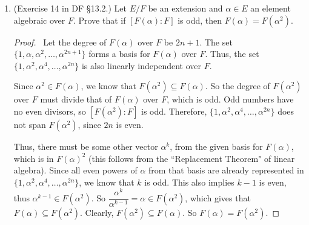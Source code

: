 \documentclass[10pt]{article}
\newcommand{\Q}{\mathbb{Q}}
\begin{document}
\begin{enumerate}[leftmargin=0cm,itemindent=.5cm,labelwidth=\itemindent,labelsep=0cm,align=left]
\begin{proof}

\ Let $F_0 = \Q$ and, for each $i = 1,2,\dots,n$, let $F_{i} = F_{i-1}(\alpha_i)$.  By previous theorems, $F_0 \subseteq F_1 \subseteq \cdots \subseteq F_n$ and $F_i = \Q(\alpha_1, \dots , \alpha_i)$ for all $i$.

If $\alpha_i \in F_{i-1}$, then $\alpha_i$ is the root of a linear polynomial over $F_{i-1}$, thus its minimal polynomial and hence, the degree of $F_i = F(\alpha_i)$ over $F_i$, is 1.  Otherwise, it is a root of the degree 2 polynomial $x^2 - \alpha_i^2 \in \Q[x] \subseteq F_{i-1}$ (since $\alpha_i^2 \in \Q$).  Since it is not the root of a linear polynomial, $x^2 - \alpha_i^2$ is its minimal polynomial, thus $F_i = F(\alpha_i)$ has degree 2 over $F_{i-1}$.  Therefore, $[F:\Q] = [F_n : F_{n-1}][F_{n-1}:F_{n-2}] \cdots [F_1 : F_0] = 2^k$ for some integer $k$.

We know that $\sqrt[3]{2}$ has degree $3$ over $\Q$, since $x^3 - 2$ is irreducible over $\Q$ by Eisenstein's Criterion ($2 \mid 2$, but $2 \nmid 1$ and $2^2 \nmid 2$).  Assume, for a contradiction, that $\sqrt[3]{2} \in F$.  Then $\Q \subset F(\sqrt[3]{2}) \subseteq F$, thus $[F(\sqrt[3]{2}) : \Q] = 3$ divides $[F:\Q] = 2^k$, a contradiction.

\end{proof}

\pagebreak

\item (Exercise 14 in DF \S 13.2.) Let $E/F$ be an extension and $\alpha \in E$ an element algebraic over $F$.  Prove that if $[F(\alpha):F]$ is odd, then $F(\alpha) = F(\alpha^2)$.

\begin{proof}

\ Let the degree of $F(\alpha)$ over $F$ be $2n+1$.  The set $\{ 1, \alpha, \alpha^2, \dots , \alpha^{2n+1} \}$ forms a basis for $F(\alpha)$ over $F$.  Thus, the set $\{1, \alpha^2, \alpha^4, \dots, \alpha^{2n} \}$ is also linearly independent over $F$.

Since $\alpha^2 \in F(\alpha)$, we know that $F(\alpha^2) \subseteq F(\alpha)$.  So the degree of $F(\alpha^2)$ over $F$ must divide that of $F(\alpha)$ over $F$, which is odd.  Odd numbers have no even divisors, so $[F(\alpha^2) : F]$ is odd.  Therefore, $\{1, \alpha^2, \alpha^4, \dots, \alpha^{2n} \}$ does not span $F(\alpha^2)$, since $2n$ is even.

Thus, there must be some other vector $\alpha^k$, from the given basis for $F(\alpha)$, which is in $F(\alpha)^2$ (this follows from the ``Replacement Theorem" of linear algebra).  Since all even powers of $\alpha$ from that basis are already represented in $\{1, \alpha^2, \alpha^4, \dots, \alpha^{2n} \}$, we know that $k$ is odd.  This also implies $k-1$ is even, thus $\alpha^{k-1} \in F(\alpha^2)$.  So $\dfrac{\alpha^k}{\alpha^{k-1}} = \alpha \in F(\alpha^2)$, which gives that $F(\alpha) \subseteq F(\alpha^2)$.  Clearly, $F(\alpha^2) \subseteq F(\alpha)$.  So $F(\alpha) = F(\alpha^2)$.


\end{proof}
\end{enumerate}
\end{document}
